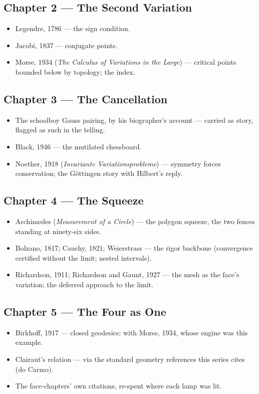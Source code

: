 \subsection*{Chapter 2 --- The Second Variation}
\begin{itemize}
\item Legendre, 1786 --- the sign condition. \item Jacobi, 1837 ---
conjugate points. \item Morse, 1934 (\emph{The Calculus of Variations
in the Large}) --- critical points bounded below by topology; the index.
\end{itemize}

\subsection*{Chapter 3 --- The Cancellation}
\begin{itemize}
\item The schoolboy Gauss pairing, by his biographer's account ---
carried as story, flagged as such in the telling.
\item Black, 1946 --- the mutilated chessboard.
\item Noether, 1918 (\emph{Invariante Variationsprobleme}) --- symmetry
forces conservation; the G\"ottingen story with Hilbert's reply.
\end{itemize}

\subsection*{Chapter 4 --- The Squeeze}
\begin{itemize}
\item Archimedes (\emph{Measurement of a Circle}) --- the polygon
squeeze, the two fences standing at ninety-six sides.
\item Bolzano, 1817; Cauchy, 1821; Weierstrass --- the rigor backbone
(convergence certified without the limit; nested intervals).
\item Richardson, 1911; Richardson and Gaunt, 1927 --- the mesh as the
face's variation; the deferred approach to the limit.
\end{itemize}

\subsection*{Chapter 5 --- The Four as One}
\begin{itemize}
\item Birkhoff, 1917 --- closed geodesics; with Morse, 1934, whose
engine was this example.
\item Clairaut's relation --- via the standard geometry references this
series cites (do Carmo).
\item The face-chapters' own citations, re-spent where each lamp was
lit.
\end{itemize}

